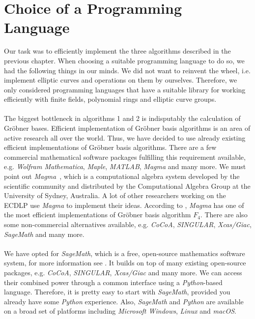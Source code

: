 \documentclass[thesis=M,english]{FITthesis}[2012/10/20]
\theoremstyle{remark}
\theoremstyle{definition}
\begin{document}
\section{Choice of a Programming Language}
Our task was to efficiently implement the three algorithms described in the previous chapter. When choosing a suitable programming language to do so, we had the following things in our minds. We did not want to reinvent the wheel, i.e. implement elliptic curves and operations on them by ourselves. Therefore, we only considered programming languages that have a suitable library for working efficiently with finite fields, polynomial rings and elliptic curve groups. \\
\\ 
\noindent The biggest bottleneck in algorithms 1 and 2 is indisputably the calculation of Gröbner bases. Efficient implementation of Gröbner basis algorithms is an area of active research all over the world. Thus, we have decided to use already existing efficient implementations of Gröbner basis algorithms. There are a few commercial mathematical software packages fulfilling this requirement available, e.g. \textit{Wolfram Mathematica}, \textit{Maple}, \textit{MATLAB}, \textit{Magma} and many more. We must point out \textit{Magma}~\cite{magma}, which is a computational algebra system developed by the scientific community and distributed by the Computational Algebra Group at the University of Sydney, Australia. A lot of other researchers working on the ECDLP use \textit{Magma} to implement their ideas. According to \cite{gbComp}, \textit{Magma} has one of the most efficient implementations of Gröbner basis algorithm $F_4$. There are also some non-commercial alternatives available, e.g. \textit{CoCoA}, \textit{SINGULAR}, \textit{Xcas/Giac}, \textit{SageMath} and many more. \\ \\
\noindent We have opted for \textit{SageMath}, which is a free, open-source mathematics software system, for more information see \cite{sage}. It builds on top of many existing open-source packages, e.g. \textit{CoCoA}, \textit{SINGULAR}, \textit{Xcas/Giac} and many more. We can access their combined power through a common interface using a \textit{Python}-based language. Therefore, it is pretty easy to start with \textit{SageMath}, provided you already have some \textit{Python} experience. Also, \textit{SageMath} and \textit{Python} are available on a broad set of platforms including \textit{Microsoft Windows}, \textit{Linux} and \textit{macOS}. 
\end{document}
